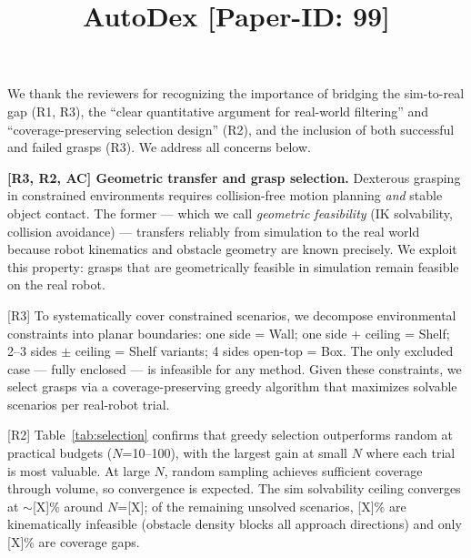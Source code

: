 \documentclass[conference]{IEEEtran}
\newcommand{\rtwo}{{\color{R2}R2}}
\newcommand{\rthree}{{\color{R3}R3}}
\newcommand{\acmark}{{\color{AC}AC}}
\newcommand{\rssparagraph}[1]{{\bf #1.}}
\begin{document}
\title{AutoDex [Paper-ID: 99]\vspace{-1cm}}
\maketitle
\thispagestyle{empty}


We thank the reviewers for recognizing the importance of bridging the sim-to-real gap ({\color{R1}R1}, {\color{R3}R3}), the ``clear quantitative argument for real-world filtering'' and ``coverage-preserving selection design'' ({\color{R2}R2}), and the inclusion of both successful and failed grasps ({\color{R3}R3}). We address all concerns below.


\rssparagraph{[\rthree, \rtwo, \acmark] Geometric transfer and grasp selection}
Dexterous grasping in constrained environments requires collision-free motion planning \emph{and} stable object contact. The former --- which we call \emph{geometric feasibility} (IK solvability, collision avoidance) --- transfers reliably from simulation to the real world because robot kinematics and obstacle geometry are known precisely. We exploit this property: grasps that are geometrically feasible in simulation remain feasible on the real robot.

[\rthree] To systematically cover constrained scenarios, we decompose environmental constraints into planar boundaries: one side = Wall; one side + ceiling = Shelf; 2--3 sides $\pm$ ceiling = Shelf variants; 4 sides open-top = Box. The only excluded case --- fully enclosed --- is infeasible for any method. Given these constraints, we select grasps via a coverage-preserving greedy algorithm that maximizes solvable scenarios per real-robot trial.

[\rtwo] Table~\ref{tab:selection} confirms that greedy selection outperforms random at practical budgets ($N$=10--100), with the largest gain at small $N$ where each trial is most valuable. At large $N$, random sampling achieves sufficient coverage through volume, so convergence is expected. The sim solvability ceiling converges at $\sim$[X]\% around $N$=[X]; of the remaining unsolved scenarios, [X]\% are kinematically infeasible (obstacle density blocks all approach directions) and only [X]\% are coverage gaps.

\end{document}
